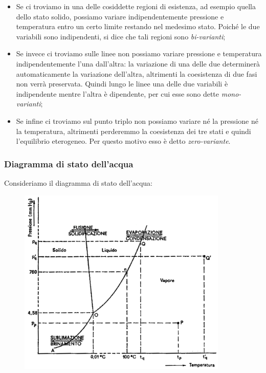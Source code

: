 \begin{itemize}
    \item Se ci troviamo in una delle cosiddette regioni di esistenza, ad esempio quella dello stato solido, possiamo variare indipendentemente pressione e temperatura entro un certo limite restando nel medesimo stato. Poiché le due variabili sono indipendenti, si dice che tali regioni sono \textit{bi-varianti};
    \item Se invece ci troviamo sulle linee non possiamo variare pressione e temperatura indipendentemente l'una dall'altra: la variazione di una delle due determinerà automaticamente la variazione dell'altra, altrimenti la coesistenza di due fasi non verrà preservata. Quindi lungo le linee una delle due variabili è indipendente mentre l'altra è dipendente, per cui esse sono dette \textit{mono-varianti};
    \item Se infine ci troviamo sul punto triplo non possiamo variare né la pressione né la temperatura, altrimenti perderemmo la coesistenza dei tre stati e quindi l'equilibrio eterogeneo. Per questo motivo esso è detto \textit{zero-variante}.
\end{itemize}

\subsubsection{Diagramma di stato dell'acqua}
Consideriamo il diagramma di stato dell'acqua:

\begin{figure}[H]
    \centering
    \includegraphics[width=10cm]{immagini/diagramma_di_stato_acqua.png}
\end{figure}

